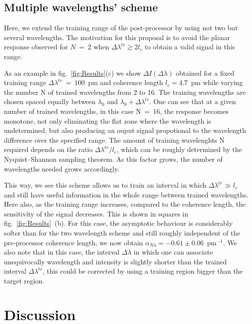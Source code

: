 \documentclass{optica-article}
\begin{document}
\subsection{Multiple wavelengths' scheme}

Here, we extend the training range of the post-processor by using not two but several wavelengths. The motivation for this proposal is to avoid the planar response observed for $N$~=~2 when $\Delta \lambda^{tr} \gtrsim 2 l_c$ to obtain a valid signal in this range. 

As an example in fig.~\ref{fig:Results}(c) we show $\Delta I(\Delta \lambda)$ obtained for a fixed training range $\Delta \lambda^{tr}$~=~$100$~pm and coherence length $l_c=4.7$~pm while varying the number N of trained wavelengths from 2 to 16. The training wavelengths are chosen spaced equally between $\lambda_0$ and $\lambda_0+\Delta \lambda^\mathit{tr}$. One can see that at a given number of trained wavelengths, in this case N~=~16, the response becomes monotone, not only eliminating the flat zone where the wavelength is undetermined, but also producing an ouput signal propotional to the wavelength difference over the specified range. The amount of training wavelenghts N required depends on the ratio  $\Delta \lambda^{tr}/l_c$, which can be roughly determined by the Nyquist–Shannon sampling theorem. As this factor grows, the number of wavelengths needed grows accordingly.

This way, we see this scheme allows us to train an interval in which $\Delta \lambda^{tr}\gg l_c$ and still have useful information in the whole range between trained wavelengths. Here also, as the training range increases, compared to the coherence length, the sensitivity of the signal decreases. This is shown in squares in fig.~\ref{fig:Results}~(b).
For this case, the asymptotic behaviour is considerably softer than for the two wavelength scheme and still roughly independent of the pre-processor coherence length, we now obtain  $\alpha_{N \lambda} = -0.61\pm0.06$~pm$^{-1}$.  We also note that in this case, the interval $\Delta \lambda$ in which one can associate unequivocally wavelength and intensity is slightly shorter than the trained interval $\Delta \lambda^{tr}$, this could be corrected by using a training region bigger than the target region.



\section{Discussion}
\end{document}
